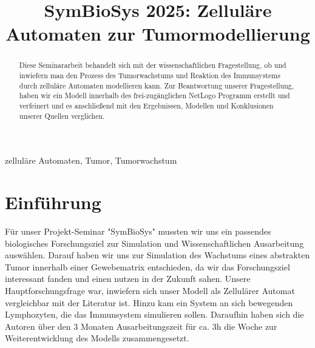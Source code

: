\documentclass[conference]{IEEEtran}
\begin{document}
\title{
	SymBioSys 2025: Zelluläre Automaten zur Tumormodellierung
}

\author{
\and
{}
\and
{}
}
\maketitle

\begin{abstract}
Diese Seminararbeit behandelt sich mit der wissenschaftlichen Fragestellung, ob und inwiefern man den Prozess des Tumorwachstums und Reaktion des Immunsystems durch zelluläre Automaten modellieren kann.
Zur Beantwortung unserer Fragestellung, haben wir ein Modell innerhalb des frei-zugänglichen NetLogo Programm erstellt und verfeinert und es anschließend mit den Ergebnissen, Modellen und Konklusionen unserer Quellen verglichen.
\end{abstract}

\begin{IEEEkeywords}
zelluläre Automaten, Tumor, Tumorwachstum
\end{IEEEkeywords}

\section{Einführung}
Für unser Projekt-Seminar "SymBioSys" mussten wir uns ein passendes biologisches Forschungsziel zur Simulation und Wissenschaftlichen Ausarbeitung auswählen. Darauf haben wir uns zur Simulation des Wachstums eines abstrakten Tumor innerhalb einer Gewebematrix entschieden, da wir das Forschungsziel interessant fanden und einen nutzen in der Zukunft sahen. Unsere Hauptforschungsfrage war, inwiefern sich unser Modell als Zellulärer Automat vergleichbar mit der Literatur ist. Hinzu kam ein System an sich bewegenden Lymphozyten, die das Immunsystem simulieren sollen.
Daraufhin haben sich die Autoren über den 3 Monaten Ausarbeitungszeit für ca. 3h die Woche zur Weiterentwicklung des Modells zusammengesetzt.
\end{document}
